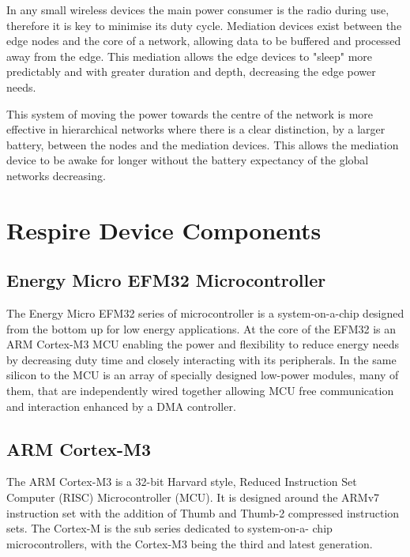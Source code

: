 In any small wireless devices the main power consumer is the radio during use, therefore it is key to
minimise its duty cycle. Mediation devices exist between the edge nodes and the core of a network,
allowing data to be buffered and processed away from the edge. This mediation allows the edge
devices to "sleep" more predictably and with greater duration and depth, decreasing the edge
power needs\cite{Sapio & Tsouri, 2010}\cite{Edgar & Jr, 2003}.


This system of moving the power towards the centre of the network is more effective in hierarchical networks
where there is a clear distinction, \eg by a larger battery, between the nodes
and the mediation devices. This allows the mediation device to be awake for
longer without the battery expectancy of the global networks decreasing.

\section{Respire Device Components}

\subsection{Energy Micro EFM32 Microcontroller}
The Energy Micro EFM32 series of microcontroller is a system-on-a-chip designed from the bottom
up for low energy applications. At the core of the EFM32 is an ARM Cortex-M3 MCU enabling the
power and flexibility to reduce energy needs by decreasing duty time and closely interacting with its
peripherals. In the same silicon to the MCU is an array of specially designed low-power modules,
many of them, that are independently wired together allowing MCU free communication and
interaction enhanced by a DMA controller.

\subsection{ARM Cortex-M3}
The ARM Cortex-M3 is a 32-bit Harvard style, Reduced Instruction Set Computer (RISC)
Microcontroller (MCU). It is designed around the ARMv7 instruction set with the addition of Thumb
and Thumb-2 compressed instruction sets. The Cortex-M is the sub series dedicated to system-on-a-
chip microcontrollers, with the Cortex-M3 being the third and latest generation.


